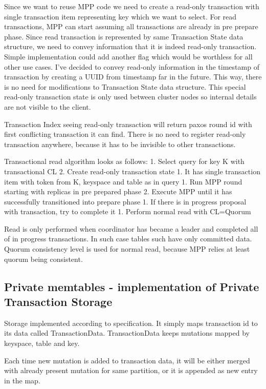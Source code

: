 Since we want to reuse MPP code we need to create a read-only transaction with single transaction item representing key which we want to select. For read transactions, MPP can start assuming all transactions are already in pre prepare phase. Since read transaction is represented by same Transaction State data structure, we need to convey information that it is indeed read-only transaction. Simple implementation could add another flag which would be worthless for all other use cases. I’ve decided to convey read-only information in the timestamp of transaction by creating a UUID from timestamp far in the future. This way, there is no need for modifications to Transaction State data structure. This special read-only transaction state is only used between cluster nodes so internal details are not visible to the client.


Transaction Index seeing read-only transaction will return paxos round id with first conflicting transaction it can find. There is no need to register read-only transaction anywhere, because it has to be invisible to other transactions.


Transactional read algorithm looks as follows:
1. Select query for key K with transactional CL
2. Create read-only transaction state
   1. It has single transaction item with token from K, keyspace and table as in query
1. Run MPP round starting with replicas in pre prepared phase
2. Execute MPP until it has successfully transitioned into prepare phase
   1. If there is in progress proposal with transaction, try to complete it
1. Perform normal read with CL=Quorum


Read is only performed when coordinator has became a leader and completed all of in progress transactions. In such case tables such have only committed data. Quorum consistency level is used for normal read, because MPP relies at least quorum being consistent.




\subsection{Private memtables - implementation of Private Transaction Storage}
Storage implemented according to specification. It simply maps transaction id to its data called TransactionData. TransactionData keeps mutations mapped by keyspace, table and key.


Each time new mutation is added to transaction data, it will be either merged with already present mutation for same partition, or it is appended as new entry in the map.


